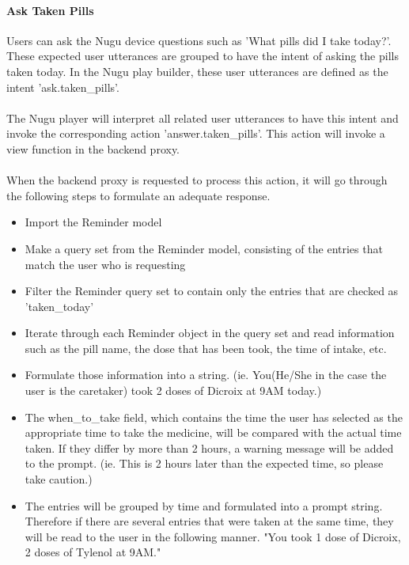 \documentclass[conference]{IEEEtran}
\begin{document}
\paragraph{Ask Taken Pills}
Users can ask the Nugu device questions such as 'What pills did I take today?'. These expected user utterances are grouped to have the intent of asking the pills taken today. In the Nugu play builder, these user utterances are defined as the intent 'ask.taken\_pills'. \\ \\
The Nugu player will interpret all related user utterances to have this intent and invoke the corresponding action 'answer.taken\_pills'. This action will invoke a view function in the backend proxy. \\ \\
When the backend proxy is requested to process this action, it will go through the following steps to formulate an adequate response.
\begin{itemize}
    \item Import the Reminder model\\
    \item Make a query set from the Reminder model, consisting of the entries that match the user who is requesting\\
    \item Filter the Reminder query set to contain only the entries that are checked as 'taken\_today'\\
    \item Iterate through each Reminder object in the query set and read information such as the pill name, the dose that has been took, the time of intake, etc.\\
    \item Formulate those information into a string. (ie. You(He/She in the case the user is the caretaker) took 2 doses of Dicroix at 9AM today.)\\
    \item The when\_to\_take field, which contains the time the user has selected as the appropriate time to take the medicine, will be compared with the actual time taken. If they differ by more than 2 hours, a warning message will be added to the prompt. (ie. This is 2 hours later than the expected time, so please take caution.)\\
    \item The entries will be grouped by time and formulated into a prompt string. Therefore if there are several entries that were taken at the same time, they will be read to the user in the following manner. "You took 1 dose of Dicroix, 2 doses of Tylenol at 9AM."\\
\end{itemize}
\end{document}
